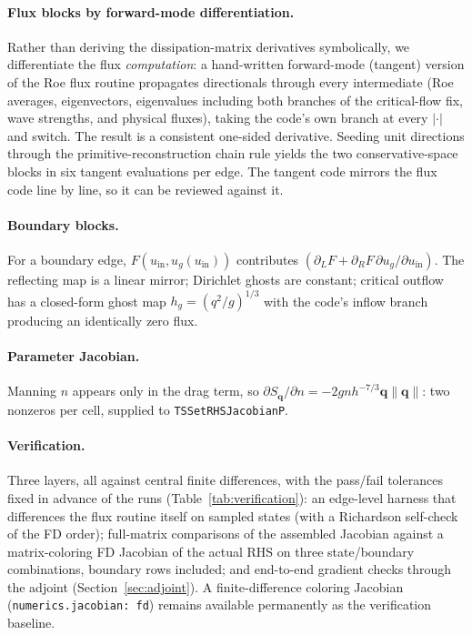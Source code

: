 \documentclass[11pt]{article}
\begin{document}
\paragraph{Flux blocks by forward-mode differentiation.}
Rather than deriving the dissipation-matrix derivatives symbolically, we
differentiate the flux \emph{computation}: a hand-written forward-mode
(tangent) version of the Roe flux routine propagates directionals
through every intermediate (Roe averages, eigenvectors, eigenvalues
including both branches of the critical-flow fix, wave strengths, and
physical fluxes), taking the code's own branch at every $|\cdot|$ and
switch. The result is a consistent one-sided derivative. Seeding unit
directions through the primitive-reconstruction chain rule yields the
two conservative-space blocks in six tangent evaluations per edge. The
tangent code mirrors the flux code line by line, so it can be reviewed
against it.

\paragraph{Boundary blocks.}
For a boundary edge, $F(u_{\mathrm{in}}, u_g(u_{\mathrm{in}}))$
contributes $(\partial_L F + \partial_R F\, \partial u_g/\partial
u_{\mathrm{in}})$. The reflecting map is a linear mirror; Dirichlet
ghosts are constant; critical outflow has a closed-form ghost map
$h_g = (q^2/g)^{1/3}$ with the code's inflow branch producing an
identically zero flux.

\paragraph{Parameter Jacobian.}
Manning $n$ appears only in the drag term, so
$\partial S_{\mathbf q}/\partial n = -2 g n h^{-7/3}\mathbf{q}\lVert\mathbf q\rVert$:
two nonzeros per cell, supplied to \texttt{TSSetRHSJacobianP}.

\paragraph{Verification.}
Three layers, all against central finite differences, with the
pass/fail tolerances fixed in advance of the runs
(Table~\ref{tab:verification}): an edge-level
harness that differences the flux routine itself on sampled states (with
a Richardson self-check of the FD order); full-matrix comparisons of the
assembled Jacobian against a matrix-coloring FD Jacobian of the actual
RHS on three state/boundary combinations, boundary rows included; and
end-to-end gradient checks through the adjoint
(Section~\ref{sec:adjoint}). A
finite-difference coloring Jacobian (\texttt{numerics.jacobian: fd})
remains available permanently as the verification baseline.
\end{document}
